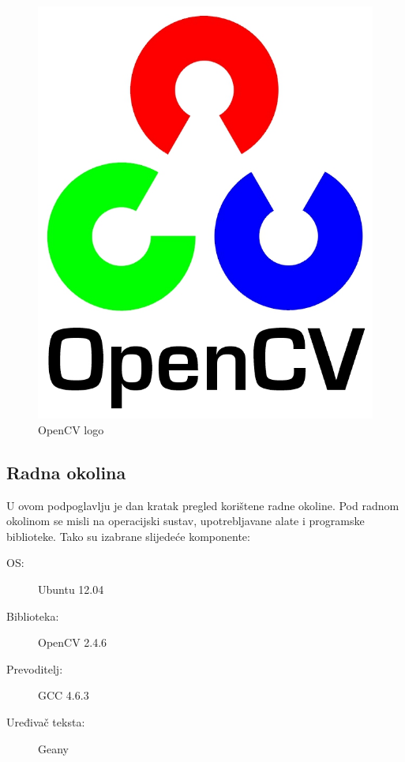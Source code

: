 \begin{figure}[h]
\centering
\includegraphics[scale=0.8]{figures/opencv.jpg}
\caption{OpenCV logo}
\label{fig:opencv.svg}
\end{figure}

\newpage
\subsection{Radna okolina} %
\label{sub:Radna okolina}

U ovom podpoglavlju je dan kratak pregled korištene radne okoline. Pod
radnom okolinom se misli na operacijski sustav, upotrebljavane alate i
programske biblioteke. Tako su izabrane slijedeće komponente:

\begin{description}
  \item[OS:] Ubuntu 12.04
  \item[Biblioteka:] OpenCV 2.4.6
  \item[Prevoditelj:] GCC 4.6.3 
  \item[Uređivač teksta:] Geany
\end{description}

